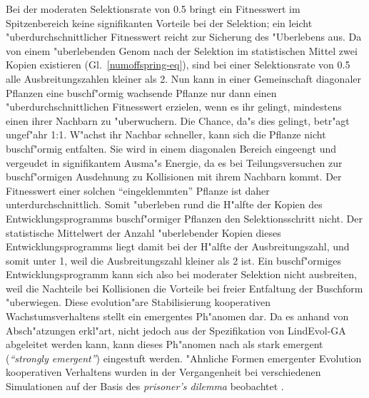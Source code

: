 Bei der moderaten Selektionsrate von 0.5 bringt ein Fitnesswert im Spitzenbereich keine signifikanten
Vorteile bei der Selektion; ein leicht "uberdurchschnittlicher Fitnesswert reicht zur Sicherung des
"Uberlebens aus. Da von einem "uberlebenden Genom nach der Selektion im statistischen Mittel
zwei Kopien existieren (Gl.\ \ref{numoffspring-eq}), sind bei einer Selektionsrate von 0.5
alle Ausbreitungszahlen kleiner als 2. Nun kann in einer Gemeinschaft diagonaler Pflanzen eine
buschf"ormig wachsende Pflanze nur dann einen "uberdurchschnittlichen Fitnesswert erzielen,
wenn es ihr gelingt, mindestens einen ihrer Nachbarn zu "uberwuchern. Die Chance, da"s dies
gelingt, betr"agt ungef"ahr 1:1. W"achst ihr Nachbar
schneller, kann sich die Pflanze nicht buschf"ormig entfalten. Sie wird in einem diagonalen Bereich
eingeengt und vergeudet in signifikantem Ausma"s Energie, da es bei Teilungsversuchen
zur buschf"ormigen Ausdehnung zu Kollisionen mit ihrem Nachbarn kommt. Der Fitnesswert einer
solchen "`eingeklemmten"' Pflanze ist daher unterdurchschnittlich. Somit "uberleben rund die H"alfte
der Kopien des Entwicklungsprogramms buschf"ormiger Pflanzen den Selektionsschritt nicht. Der statistische
Mittelwert der Anzahl "uberlebender Kopien dieses Entwicklungsprogramms liegt damit bei der H"alfte
der Ausbreitungszahl, und somit unter 1, weil die Ausbreitungszahl kleiner als 2 ist. Ein buschf"ormiges
Entwicklungsprogramm kann sich also bei moderater Selektion nicht ausbreiten, weil die Nachteile
bei Kollisionen die Vorteile bei freier Entfaltung der Buschform "uberwiegen. Diese evolution"are
Stabilisierung kooperativen Wachstumsverhaltens stellt ein emergentes Ph"anomen dar. Da es anhand von
Absch"atzungen erkl"art, nicht jedoch aus der Spezifikation von LindEvol-GA abgeleitet werden kann,
kann dieses Ph"anomen nach \cite{Assad92} als stark emergent ({\slshape "`strongly emergent"'}) eingestuft werden.
"Ahnliche Formen emergenter Evolution kooperativen Verhaltens wurden in der Vergangenheit bei verschiedenen Simulationen
auf der Basis des \textsl{prisoner's dilemma} beobachtet \cite{Lindgren92,May95}.

